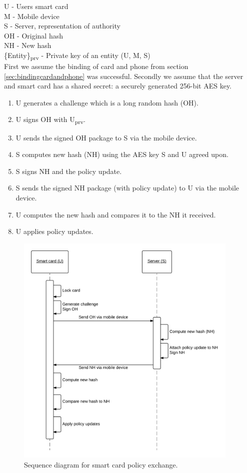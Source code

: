U - Users smart card \\
M - Mobile device \\
S - Server, representation of authority \\
OH - Original hash \\
NH - New hash \\
\{Entity\}\textsubscript{prv} - Private key of an entity (U, M, S)\\

First we assume the binding of card and phone from section \ref{sec:bindingcardandphone} was successful. Secondly we assume that the server and smart card has a shared secret: a securely generated 256-bit AES key.

\begin{enumerate}
    \item U generates a challenge which is a long random hash (OH).
    \item U signs OH with U\textsubscript{prv}.
    \item U sends the signed OH package to S via the mobile device.
    \item S computes new hash (NH) using the AES key S and U agreed upon.
    \item S signs NH and the policy update.
    \item S sends the signed NH package (with policy update) to U via the mobile device.
    \item U computes the new hash and compares it to the NH it received.
    \item U applies policy updates.
\end{enumerate}

\begin{figure}[h!]
  \captionsetup{justification=centering,margin=1.5cm}
  \caption{Sequence diagram for smart card policy exchange.}
  \label{fig:SQD_policy}
  \centering
    \includegraphics[width=0.95\textwidth]{images/SQD_Policy_Exchange.png}
\end{figure}

